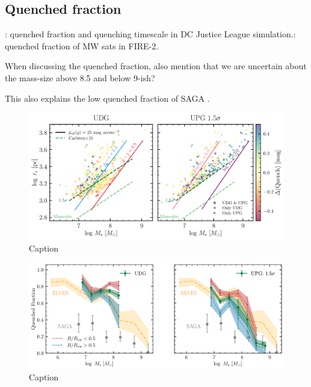 \documentclass[twocolumn,astrosymb,twocolappendix]{aastex631}
\begin{document}
\begin{CJK*}{UTF8}{gbsn}
\subsection{Quenched fraction}\label{sec:quench}

\citep{Baxter2021}

\citep{Akins2021}: quenched fraction and quenching timescale in DC Justice League simulation.\citep{Samuel2022}: quenched fraction of MW sats in FIRE-2.

When discussing the quenched fraction, also mention that we are uncertain about the mass-size above 8.5 and below 9-ish? 


This also explains the low quenched fraction of SAGA \citep{CarlstenELVES2022}.


\begin{figure}
	\vbox{ 
		\centering
		\includegraphics[width=1\linewidth]{mass_size_plane.pdf}
	}
    \caption{Caption}
    \label{fig:mass_size}
\end{figure}

\begin{figure}
	\vbox{ 
		\centering
		\includegraphics[width=1\linewidth]{quenched_frac_dist2host.pdf}
	}
    \caption{Caption}
    \label{fig:qfrac_dist2host}
\end{figure}


\end{CJK*}
\end{document}
